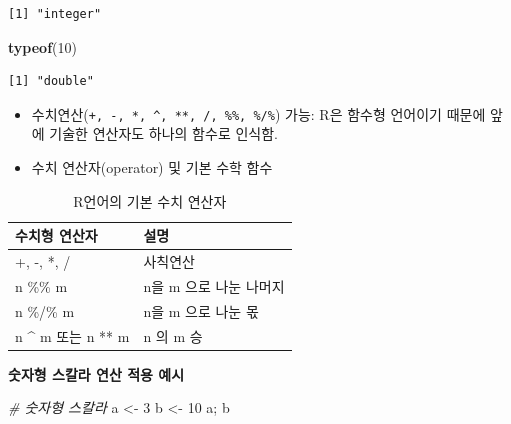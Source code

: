 \documentclass[
  11pt,
]{krantz}
\newenvironment{Shaded}{\begin{snugshade}}{\end{snugshade}}
\newcommand{\CommentTok}[1]{\textcolor[rgb]{0.37,0.37,0.37}{\textit{#1}}}
\newcommand{\DecValTok}[1]{\textcolor[rgb]{0.06,0.06,0.06}{#1}}
\newcommand{\KeywordTok}[1]{\textcolor[rgb]{0.27,0.27,0.27}{\textbf{#1}}}
\newcommand{\NormalTok}[1]{#1}
\newcommand{\StringTok}[1]{\textcolor[rgb]{0.5,0.5,0.5}{#1}}
\providecommand{\tightlist}{%
  \setlength{\itemsep}{0pt}\setlength{\parskip}{0pt}}
\begin{document}
\begin{verbatim}
[1] "integer"
\end{verbatim}

\begin{Shaded}
\begin{Highlighting}[]
\KeywordTok{typeof}\NormalTok{(}\DecValTok{10}\NormalTok{)}
\end{Highlighting}
\end{Shaded}

\begin{verbatim}
[1] "double"
\end{verbatim}

\normalsize

\begin{itemize}
\tightlist
\item
  수치연산(\texttt{+,\ -,\ *,\ \^{},\ **,\ /,\ \%\%,\ \%/\%}) 가능: R은 함수형 언어이기 때문에 앞에 기술한 연산자도 하나의 함수로 인식함.
\item
  수치 연산자(operator) 및 기본 수학 함수
\end{itemize}

\footnotesize

\begin{table}[H]

\caption{\label{tab:operation}R언어의 기본 수치 연산자}
\centering
\fontsize{10}{12}\selectfont
\begin{tabular}[t]{>{\raggedright\arraybackslash}p{4cm}>{\raggedright\arraybackslash}p{6cm}}
\toprule
수치형 연산자 & 설명\\
\midrule
\rowcolor{gray!6}  +, -, *, / & 사칙연산\\
n \%\% m & n을 m 으로 나눈 나머지\\
\rowcolor{gray!6}  n \%/\% m & n을 m 으로 나눈 몫\\
n \textasciicircum{} m 또는 n ** m & n 의 m 승\\
\bottomrule
\end{tabular}
\end{table}

\normalsize

\textbf{숫자형 스칼라 연산 적용 예시}

\footnotesize

\begin{Shaded}
\begin{Highlighting}[]
\CommentTok{# 숫자형 스칼라}
\NormalTok{a <-}\StringTok{ }\DecValTok{3}
\NormalTok{b <-}\StringTok{ }\DecValTok{10}
\NormalTok{a; b}
\end{Highlighting}
\end{Shaded}
\end{document}
